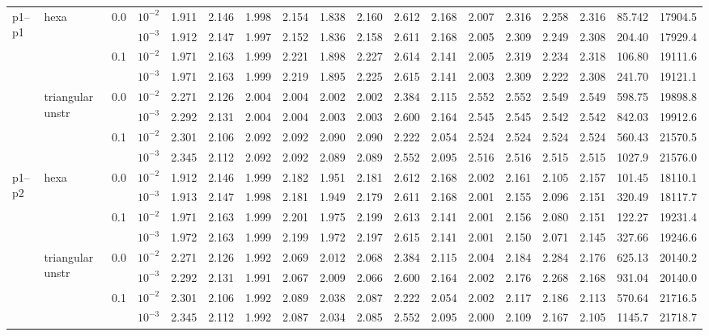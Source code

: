 \begin{longtable}{llclrrrrrrrrrrrrrr}
\multirow{8}{*}{p1--p1} & \multirow{4}{*}{hexa} & \multirow{2}{*}{0.0} & $10^{-2}$ & 1.911 & 2.146 & 1.998 & 2.154 & 1.838 & 2.160 & 2.612 & 2.168 & 2.007 & 2.316 & 2.258 & 2.316 & 85.742 & 17904.5 \\
& & & $10^{-3}$ & 1.912 & 2.147 & 1.997 & 2.152 & 1.836 & 2.158 & 2.611 & 2.168 & 2.005 & 2.309 & 2.249 & 2.308 & 204.40 & 17929.4 \\\cline{3-18}
& & \multirow{2}{*}{0.1} & $10^{-2}$ & 1.971 & 2.163 & 1.999 & 2.221 & 1.898 & 2.227 & 2.614 & 2.141 & 2.005 & 2.319 & 2.234 & 2.318 & 106.80 & 19111.6 \\
& & & $10^{-3}$ & 1.971 & 2.163 & 1.999 & 2.219 & 1.895 & 2.225 & 2.615 & 2.141 & 2.003 & 2.309 & 2.222 & 2.308 & 241.70 & 19121.1 \\\cline{2-18}
& \multirow{4}{*}{triangular unstr} & \multirow{2}{*}{0.0} & $10^{-2}$ & 2.271 & 2.126 & 2.004 & 2.004 & 2.002 & 2.002 & 2.384 & 2.115 & 2.552 & 2.552 & 2.549 & 2.549 & 598.75 & 19898.8 \\
& & & $10^{-3}$ & 2.292 & 2.131 & 2.004 & 2.004 & 2.003 & 2.003 & 2.600 & 2.164 & 2.545 & 2.545 & 2.542 & 2.542 & 842.03 & 19912.6 \\\cline{3-18}
& & \multirow{2}{*}{0.1} & $10^{-2}$ & 2.301 & 2.106 & 2.092 & 2.092 & 2.090 & 2.090 & 2.222 & 2.054 & 2.524 & 2.524 & 2.524 & 2.524 & 560.43 & 21570.5 \\
& & & $10^{-3}$ & 2.345 & 2.112 & 2.092 & 2.092 & 2.089 & 2.089 & 2.552 & 2.095 & 2.516 & 2.516 & 2.515 & 2.515 & 1027.9 & 21576.0 \\\hline

\multirow{8}{*}{p1--p2} & \multirow{4}{*}{hexa} & \multirow{2}{*}{0.0} & $10^{-2}$ & 1.912 & 2.146 & 1.999 & 2.182 & 1.951 & 2.181 & 2.612 & 2.168 & 2.002 & 2.161 & 2.105 & 2.157 & 101.45 & 18110.1 \\
& & & $10^{-3}$ & 1.913 & 2.147 & 1.998 & 2.181 & 1.949 & 2.179 & 2.611 & 2.168 & 2.001 & 2.155 & 2.096 & 2.151 & 320.49 & 18117.7 \\\cline{3-18}
& & \multirow{2}{*}{0.1} & $10^{-2}$ & 1.971 & 2.163 & 1.999 & 2.201 & 1.975 & 2.199 & 2.613 & 2.141 & 2.001 & 2.156 & 2.080 & 2.151 & 122.27 & 19231.4 \\
& & & $10^{-3}$ & 1.972 & 2.163 & 1.999 & 2.199 & 1.972 & 2.197 & 2.615 & 2.141 & 2.001 & 2.150 & 2.071 & 2.145 & 327.66 & 19246.6 \\\cline{2-18}
& \multirow{4}{*}{triangular unstr} & \multirow{2}{*}{0.0} & $10^{-2}$ & 2.271 & 2.126 & 1.992 & 2.069 & 2.012 & 2.068 & 2.384 & 2.115 & 2.004 & 2.184 & 2.284 & 2.176 & 625.13 & 20140.2 \\
& & & $10^{-3}$ & 2.292 & 2.131 & 1.991 & 2.067 & 2.009 & 2.066 & 2.600 & 2.164 & 2.002 & 2.176 & 2.268 & 2.168 & 931.04 & 20140.0 \\\cline{3-18}
& & \multirow{2}{*}{0.1} & $10^{-2}$ & 2.301 & 2.106 & 1.992 & 2.089 & 2.038 & 2.087 & 2.222 & 2.054 & 2.002 & 2.117 & 2.186 & 2.113 & 570.64 & 21716.5 \\
& & & $10^{-3}$ & 2.345 & 2.112 & 1.992 & 2.087 & 2.034 & 2.085 & 2.552 & 2.095 & 2.000 & 2.109 & 2.167 & 2.105 & 1145.7 & 21718.7 \\\hline


\end{longtable}
